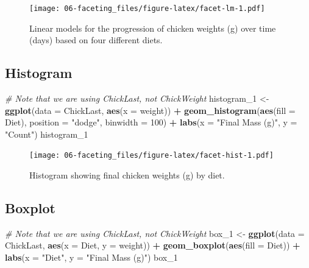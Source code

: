 \documentclass[
]{book}
\newenvironment{Shaded}{\begin{snugshade}}{\end{snugshade}}
\newcommand{\CommentTok}[1]{\textcolor[rgb]{0.56,0.35,0.01}{\textit{#1}}}
\newcommand{\DataTypeTok}[1]{\textcolor[rgb]{0.13,0.29,0.53}{#1}}
\newcommand{\DecValTok}[1]{\textcolor[rgb]{0.00,0.00,0.81}{#1}}
\newcommand{\KeywordTok}[1]{\textcolor[rgb]{0.13,0.29,0.53}{\textbf{#1}}}
\newcommand{\NormalTok}[1]{#1}
\newcommand{\OperatorTok}[1]{\textcolor[rgb]{0.81,0.36,0.00}{\textbf{#1}}}
\newcommand{\StringTok}[1]{\textcolor[rgb]{0.31,0.60,0.02}{#1}}
\begin{document}
\begin{figure}
\centering
\texttt{[image: 06-faceting\_files/figure-latex/facet-lm-1.pdf]}
\caption{\label{fig:facet-lm}Linear models for the progression of chicken weights (g) over time (days) based on four different diets.}
\end{figure}

\hypertarget{histogram}{%
\subsection{Histogram}\label{histogram}}

\begin{Shaded}
\begin{Highlighting}[]
\CommentTok{\# Note that we are using \textquotesingle{}ChickLast\textquotesingle{}, not \textquotesingle{}ChickWeight\textquotesingle{}}
\NormalTok{histogram\_}\DecValTok{1}\NormalTok{ <{-}}\StringTok{ }\KeywordTok{ggplot}\NormalTok{(}\DataTypeTok{data =}\NormalTok{ ChickLast, }\KeywordTok{aes}\NormalTok{(}\DataTypeTok{x =}\NormalTok{ weight)) }\OperatorTok{+}
\StringTok{  }\KeywordTok{geom\_histogram}\NormalTok{(}\KeywordTok{aes}\NormalTok{(}\DataTypeTok{fill =}\NormalTok{ Diet), }\DataTypeTok{position =} \StringTok{"dodge"}\NormalTok{, }\DataTypeTok{binwidth =} \DecValTok{100}\NormalTok{) }\OperatorTok{+}
\StringTok{  }\KeywordTok{labs}\NormalTok{(}\DataTypeTok{x =} \StringTok{"Final Mass (g)"}\NormalTok{, }\DataTypeTok{y =} \StringTok{"Count"}\NormalTok{)}
\NormalTok{histogram\_}\DecValTok{1}
\end{Highlighting}
\end{Shaded}

\begin{figure}
\centering
\texttt{[image: 06-faceting\_files/figure-latex/facet-hist-1.pdf]}
\caption{\label{fig:facet-hist}Histogram showing final chicken weights (g) by diet.}
\end{figure}

\hypertarget{boxplot}{%
\subsection{Boxplot}\label{boxplot}}

\begin{Shaded}
\begin{Highlighting}[]
\CommentTok{\# Note that we are using \textquotesingle{}ChickLast\textquotesingle{}, not \textquotesingle{}ChickWeight\textquotesingle{}}
\NormalTok{box\_}\DecValTok{1}\NormalTok{ <{-}}\StringTok{ }\KeywordTok{ggplot}\NormalTok{(}\DataTypeTok{data =}\NormalTok{ ChickLast, }\KeywordTok{aes}\NormalTok{(}\DataTypeTok{x =}\NormalTok{ Diet, }\DataTypeTok{y =}\NormalTok{ weight)) }\OperatorTok{+}
\StringTok{  }\KeywordTok{geom\_boxplot}\NormalTok{(}\KeywordTok{aes}\NormalTok{(}\DataTypeTok{fill =}\NormalTok{ Diet)) }\OperatorTok{+}
\StringTok{  }\KeywordTok{labs}\NormalTok{(}\DataTypeTok{x =} \StringTok{"Diet"}\NormalTok{, }\DataTypeTok{y =} \StringTok{"Final Mass (g)"}\NormalTok{)}
\NormalTok{box\_}\DecValTok{1}
\end{Highlighting}
\end{Shaded}
\end{document}
